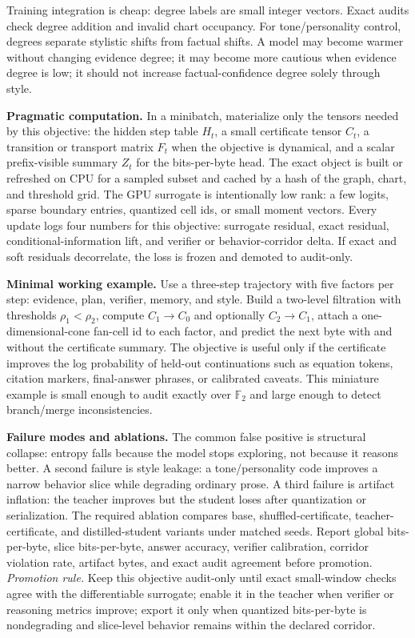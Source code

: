\documentclass[10pt]{article}
\newcommand{\FF}{\mathbb{F}}
\numberwithin{equation}{section}
\begin{document}
Training integration is cheap: degree labels are small integer vectors. Exact audits check degree addition and invalid chart occupancy. For tone/personality control, degrees separate stylistic shifts from factual shifts. A model may become warmer without changing evidence degree; it may become more cautious when evidence degree is low; it should not increase factual-confidence degree solely through style.

\noindent\textbf{Pragmatic computation.} In a minibatch, materialize only the tensors needed by this objective: the hidden step table $H_t$, a small certificate tensor $C_t$, a transition or transport matrix $F_t$ when the objective is dynamical, and a scalar prefix-visible summary $Z_t$ for the bits-per-byte head. The exact object is built or refreshed on CPU for a sampled subset and cached by a hash of the graph, chart, and threshold grid. The GPU surrogate is intentionally low rank: a few logits, sparse boundary entries, quantized cell ids, or small moment vectors. Every update logs four numbers for this objective: surrogate residual, exact residual, conditional-information lift, and verifier or behavior-corridor delta. If exact and soft residuals decorrelate, the loss is frozen and demoted to audit-only.

\noindent\textbf{Minimal working example.} Use a three-step trajectory with five factors per step: evidence, plan, verifier, memory, and style. Build a two-level filtration with thresholds $\rho_1<\rho_2$, compute $C_1\to C_0$ and optionally $C_2\to C_1$, attach a one-dimensional-cone fan-cell id to each factor, and predict the next byte with and without the certificate summary. The objective is useful only if the certificate improves the log probability of held-out continuations such as equation tokens, citation markers, final-answer phrases, or calibrated caveats. This miniature example is small enough to audit exactly over $\FF_2$ and large enough to detect branch/merge inconsistencies.

\noindent\textbf{Failure modes and ablations.} The common false positive is structural collapse: entropy falls because the model stops exploring, not because it reasons better. A second failure is style leakage: a tone/personality code improves a narrow behavior slice while degrading ordinary prose. A third failure is artifact inflation: the teacher improves but the student loses after quantization or serialization. The required ablation compares base, shuffled-certificate, teacher-certificate, and distilled-student variants under matched seeds. Report global bits-per-byte, slice bits-per-byte, answer accuracy, verifier calibration, corridor violation rate, artifact bytes, and exact audit agreement before promotion.
\vfill
\noindent\emph{Promotion rule.} Keep this objective audit-only until exact small-window checks agree with the differentiable surrogate; enable it in the teacher when verifier or reasoning metrics improve; export it only when quantized bits-per-byte is nondegrading and slice-level behavior remains within the declared corridor.
\clearpage
\end{document}
